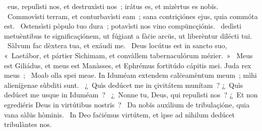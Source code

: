 \psalmChapterWithInscription{}
{  }
{%
~eus, repulìsti nos, et destruxìsti nos~; irátus es, et mizèrtus es nobïs. 
~Commovìsti terram, et conturbavìsti eam~; sana contriçiónes ejus, quia commóta est. 
~Ostensìsti pòpulo tuo dura~; potavìsti nos vino compüncçiónis. 
~dedìsti metuèntibus te significaçiónem, ut fúġiant a fàċie arcüs, ut liberèntur dilécti tui. 
~Sàlvum fac dèxtera tua, et exáudi me. 
~Deus locútus est in sancto suo, «~Laetábor, et pártier Sìchimam, et convàllem tabernaculórum mézier.~»
~Meus est Giliádus, et meus est Manàsses, et Ephrémus fortitúdo cápitis mei. Juda rex meus~; 
~Moab olla spei meae. In Iduméam extendem calċeamèntum meum~; mìhi alieníġenae sùbditi sunt. 
~¿~Quìs dedúcet me in çivitátem munítam~? ¿~Quìs dedúcet me usque in Iduméam~? 
~¿~Nonne tu, Deus, qui repulìsti nos~? ¿~Et non egrediéris Deus in virtútibus nostrïs~? 
~Da nobïs auxìlium de tribulaçióne, quia vana sàlüs hòminis. 
~In Deo faċiémus virtútem, et ìpse ad nìhilum dedúcet tribulàntes nos. 
}
